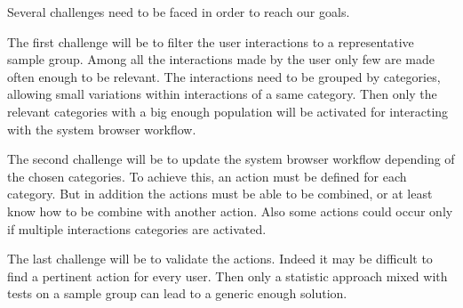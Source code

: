 \documentclass[12pt]{article}
\begin{document}
Several challenges need to be faced in order to reach our goals.

The first challenge will be to filter the user interactions to a representative sample group. 
Among all the interactions made by the user only few are made often enough to be relevant.
The interactions need to be grouped by categories, allowing small variations within interactions of a same category.
Then only the relevant categories with a big enough population will be activated for interacting with the system browser workflow.

The second challenge will be to update the system browser workflow depending of the chosen categories.
To achieve this, an action must be defined for each category.
But in addition the actions must be able to be combined, or at least know how to be combine with another action.
Also some actions could occur only if multiple interactions categories are activated.

The last challenge will be to validate the actions.
Indeed it may be difficult to find a pertinent action for every user.
Then only a statistic approach mixed with tests on a sample group can lead to a generic enough solution.
\end{document}
